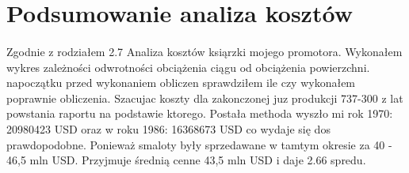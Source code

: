 \clearpage
\section{Podsumowanie analiza kosztów}

    \paragraph{}
        Zgodnie z rodziałem 2.7 Analiza kosztów ksiąrzki \cite{galinski} mojego promotora. 
        Wykonałem wykres zależności odwrotności obciążenia ciągu od obciążenia powierzchni.
        napoczątku przed wykonaniem obliczen sprawdziłem ile czy wykonałem poprawnie obliczenia.
        Szacujac koszty dla zakonczonej juz produkcji 737-300 z lat powstania raportu na podstawie ktorego.
        Postała methoda wyszło mi rok 1970: 20980423 USD oraz w roku 1986: 16368673 USD co wydaje się dos prawdopodobne.
        Ponieważ smaloty były sprzedawane w tamtym okresie za 40 - 46,5 mln USD. Przyjmuje średnią cenne 43,5 mln USD i daje 2.66 spredu.

